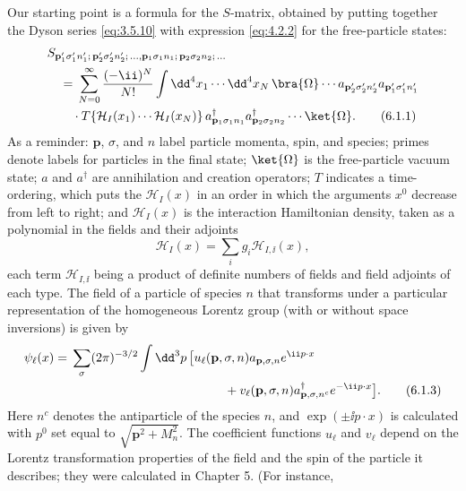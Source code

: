 Our starting point is a formula for the $S$-matrix, obtained by putting
together the Dyson series \eqref{eq:3.5.10} with expression \eqref{eq:4.2.2} for the
free-particle states:
\begin{align}
&S_{\mathbf p'_1\sigma'_1n'_1;\,\mathbf p'_2\sigma'_2n'_2;\,\ldots,
       \mathbf p_1\sigma_1n_1;\,\mathbf p_2\sigma_2n_2;\,\ldots}
\notag\\
&\quad={}
\sum_{N=0}^{\infty}\frac{(-\ii)^N}{N!}
\int \dd^4x_1\cdots \dd^4x_N\,
\bra{\Omega}\cdots
a_{\mathbf p'_2\sigma'_2n'_2}a_{\mathbf p'_1\sigma'_1n'_1}
\notag\\
&\qquad\cdot
T\!\left\{\mathcal H_I(x_1)\cdots\mathcal H_I(x_N)\right\}
a^\dagger_{\mathbf p_1\sigma_1n_1}
a^\dagger_{\mathbf p_2\sigma_2n_2}\cdots\ket{\Omega}.
\tag{6.1.1}
\label{eq:6.1.1}
\end{align}
As a reminder: $\mathbf p$, $\sigma$, and $n$ label particle momenta, spin,
and species; primes denote labels for particles in the final state;
$\ket{\Omega}$ is the free-particle vacuum state; $a$ and $a^\dagger$ are
annihilation and creation operators; $T$ indicates a time-ordering, which puts
the $\mathcal H_I(x)$ in an order in which the arguments $x^0$ decrease from
left to right; and $\mathcal H_I(x)$ is the interaction Hamiltonian density,
taken as a polynomial in the fields and their adjoints
\begin{equation}
\mathcal H_I(x)=\sum_i g_i\mathcal H_{I,\ii}(x),
\tag{6.1.2}
\label{eq:6.1.2}
\end{equation}
each term $\mathcal H_{I,\ii}$ being a product of definite numbers of fields and
field adjoints of each type. The field of a particle of species $n$ that
transforms under a particular representation of the homogeneous Lorentz group
(with or without space inversions) is given by
\begin{align}
\psi_\ell(x)={}&\sum_\sigma(2\pi)^{-3/2}\int \dd^3p\,
\bigl[u_\ell(\mathbf p,\sigma,n)a_{\mathbf p,\sigma,n}e^{\ii p\cdot x}
\notag\\
&\hspace{43mm}
+v_\ell(\mathbf p,\sigma,n)a^\dagger_{\mathbf p,\sigma,n^c}e^{-\ii p\cdot x}
\bigr].
\tag{6.1.3}
\label{eq:6.1.3}
\end{align}
Here $n^c$ denotes the antiparticle of the species $n$, and
$\exp(\pm \ii p\cdot x)$ is calculated with $p^0$ set equal to
$\sqrt{\mathbf p^2+M_n^2}$. The coefficient functions $u_\ell$ and $v_\ell$
depend on the Lorentz transformation properties of the field and the spin of
the particle it describes; they were calculated in Chapter 5. (For instance,
